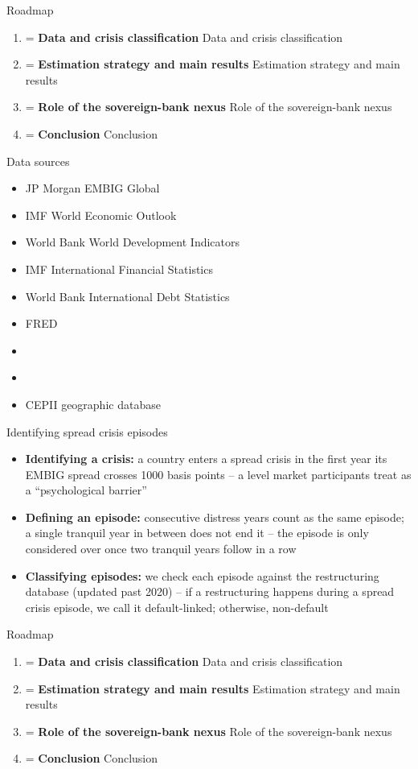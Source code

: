 \documentclass[aspectratio=169]{beamer}
\newcounter{sectionmark}
\newcommand{\roadmapitem}[2]{%
  \ifnum#1=\value{sectionmark}%
    {\bfseries#2}%
  \else
    #2%
  \fi
}
\newcommand{\sectionroadmap}[1]{%
  \setcounter{sectionmark}{#1}%
  \begin{frame}{Roadmap}
    \footnotesize
    \begin{enumerate}
      \item \roadmapitem{1}{Data and crisis classification}
      \item \roadmapitem{2}{Estimation strategy and main results}
      \item \roadmapitem{3}{Role of the sovereign-bank nexus}
      \item \roadmapitem{4}{Conclusion}
    \end{enumerate}
  \end{frame}
}
\begin{document}
\sectionroadmap{1}

\begin{frame}{Data sources}
  \footnotesize
  \begin{itemize}
    \item JP Morgan EMBIG Global
    \item IMF World Economic Outlook
    \item World Bank World Development Indicators
    \item IMF International Financial Statistics
    \item World Bank International Debt Statistics
    \item FRED
    \item \citet{asonuma2016sovereign}
    \item \citet{laeven2013systemic,laeven2026systemic}
    \item CEPII geographic database
  \end{itemize}
\end{frame}

\begin{frame}{Identifying spread crisis episodes}
  \footnotesize
  \begin{itemize}
    \item \textbf{Identifying a crisis:} a country enters a spread
    crisis in the first year its EMBIG spread crosses 1000 basis
    points -- a level market participants treat as a
    ``psychological barrier'' \citep{pescatori2007adequately}
    \item \textbf{Defining an episode:} consecutive distress years
    count as the same episode; a single tranquil year in between does
    not end it -- the episode is only considered over once two
    tranquil years follow in a row
    \item \textbf{Classifying episodes:} we check each episode
    against the \citet{asonuma2016sovereign} restructuring database
    (updated past 2020) -- if a restructuring happens during a spread
    crisis episode, we call it default-linked; otherwise, non-default
  \end{itemize}
\end{frame}

\sectionroadmap{2}
\end{document}
